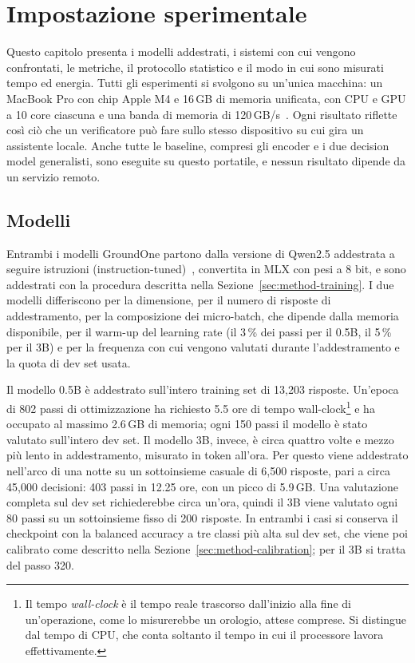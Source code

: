 \chapter{Impostazione sperimentale}
\label{sec:setup}


Questo capitolo presenta i modelli addestrati, i sistemi con cui vengono confrontati, le metriche, il protocollo
statistico e il modo in cui sono misurati tempo ed energia. Tutti gli esperimenti si svolgono su un'unica macchina: un
MacBook Pro con chip Apple M4 e 16\,GB di memoria unificata, con CPU e GPU a 10 core ciascuna e una banda di memoria di
120\,GB/s~\cite{apple2024m4specs}. Ogni risultato riflette così ciò che un verificatore può fare sullo stesso
dispositivo su cui gira un assistente locale. Anche tutte le baseline, compresi gli encoder e i due decision model
generalisti, sono eseguite su questo portatile, e nessun risultato dipende da un servizio remoto.

\section{Modelli}
\label{sec:setup-models}

Entrambi i modelli GroundOne partono dalla versione di Qwen2.5 addestrata a seguire istruzioni (instruction-tuned)~\cite{qwen2024qwen25},
convertita in MLX con pesi a 8 bit, e sono addestrati con la procedura descritta nella Sezione~\ref{sec:method-training}. I due modelli differiscono per la dimensione, per il numero di risposte di addestramento, per la composizione dei micro-batch, che dipende dalla memoria disponibile, per il warm-up del learning rate (il 3\,\% dei passi per il 0.5B, il 5\,\% per il 3B) e per la frequenza con cui vengono valutati durante l'addestramento e la quota di dev set usata.

Il modello 0.5B è addestrato sull'intero training set di 13{,}203 risposte. Un'epoca di 802 passi di ottimizzazione ha
richiesto 5.5 ore di tempo wall-clock\footnote{Il tempo \emph{wall-clock} è il tempo reale trascorso dall'inizio alla
fine di un'operazione, come lo misurerebbe un orologio, attese comprese. Si distingue dal tempo di CPU, che conta
soltanto il tempo in cui il processore lavora effettivamente.} e ha occupato al massimo 2.6\,GB di memoria; ogni 150
passi il modello è stato valutato sull'intero dev set. Il modello 3B, invece, è circa quattro volte e mezzo più lento in addestramento, misurato in token all'ora. Per
questo viene addestrato nell'arco di una notte su un sottoinsieme casuale di 6{,}500 risposte, pari a circa 45{,}000
decisioni: 403 passi in 12.25 ore, con un picco di 5.9\,GB. Una valutazione completa sul dev set richiederebbe circa
un'ora, quindi il 3B viene valutato ogni 80 passi su un sottoinsieme fisso di 200 risposte. In entrambi i casi si
conserva il checkpoint con la balanced accuracy a tre classi più alta sul dev set, che viene poi calibrato come descritto nella
Sezione~\ref{sec:method-calibration}; per il 3B si tratta del passo 320.

